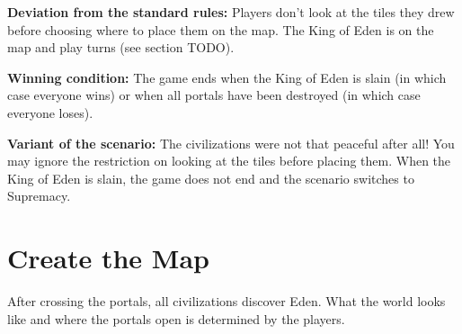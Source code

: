 \documentclass[a4paper]{article}
\begin{document}
\begin{description}
            \textbf{Deviation from the standard rules:}
            Players don't look at the tiles they drew before choosing
            where to place them on the map.
            The King of Eden is on the map and play turns (see section TODO).
            
            \textbf{Winning condition:}
            The game ends when the King of Eden is slain (in which case everyone wins)
            or when all portals have been destroyed (in which case everyone loses).
            
            \textbf{Variant of the scenario:}
            The civilizations were not that peaceful after all!
            You may ignore the restriction on looking at the tiles before placing them.
            When the King of Eden is slain,
            the game does not end and the scenario switches to Supremacy.
    \end{description}



\newpage
\section{Create the Map}

    After crossing the portals, all civilizations discover Eden.
    What the world looks like and where the portals open is determined by the players.
    
\end{document}
